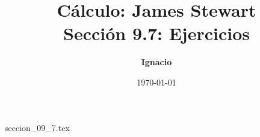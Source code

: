 \documentclass[11pt,spanish,oneside]{report}
\title{\textbf{Cálculo: James Stewart} \\ \Large Sección 9.7: Ejercicios}
\author{\textbf{Ignacio}}
\date{\today}
\begin{document}
\maketitle

{seccion_09_7.tex}
\end{document}
